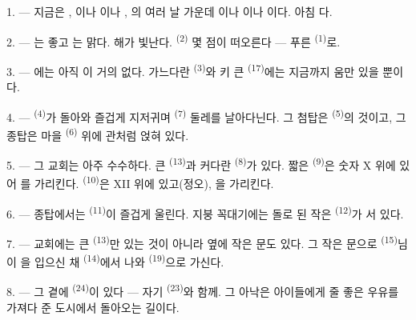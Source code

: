 \VUsaut{4.0mm}
\VUsaut{3.0mm}

\VUsaut{2.4mm}

\VUsaut{3.0mm}

1. --- 지금은 , 이나 이나 ,
의 여러 날 가운데 이나 이나
이다. 아침 다.

2. --- 는 좋고 는 맑다. 해가 빛난다. 
\textsuperscript{(2)} 몇 점이 떠오른다 — 푸른  \textsuperscript{(1)}로.

3. --- 에는 아직 이 거의 없다. 가느다란 
\textsuperscript{(3)}와 키 큰  \textsuperscript{(17)}에는 지금까지
움만 있을 뿐이다.

4. ---  \textsuperscript{(4)}가 돌아와 즐겁게 지저귀며 
\textsuperscript{(7)} 둘레를 날아다닌다. 그 첨탑은  \textsuperscript{(5)}의
것이고, 그 종탑은 마을  \textsuperscript{(6)} 위에 관처럼 얹혀 있다.

\VUsaut{3.4mm}
\VUsaut{3.0mm}

5. --- 그 교회는 아주 수수하다. 큰  \textsuperscript{(13)}과 커다란
 \textsuperscript{(8)}가 있다. 짧은  \textsuperscript{(9)}은
숫자 X 위에 있어 를 가리킨다.  \textsuperscript{(10)}은 XII
위에 있고(정오), 을 가리킨다.

6. --- 종탑에서는  \textsuperscript{(11)}이 즐겁게 울린다. 지붕 꼭대기에는
돌로 된 작은  \textsuperscript{(12)}가 서 있다.

7. --- 교회에는 큰  \textsuperscript{(13)}만 있는 것이 아니라 옆에 작은
문도 있다. 그 작은 문으로  \textsuperscript{(15)}님이
을 입으신 채  \textsuperscript{(14)}에서 나와
 \textsuperscript{(19)}으로 가신다.

8. --- 그 곁에  \textsuperscript{(24)}이 있다 — 자기
 \textsuperscript{(23)}와 함께. 그 아낙은 아이들에게 줄 좋은 우유를 가져다
준 도시에서 돌아오는 길이다.

